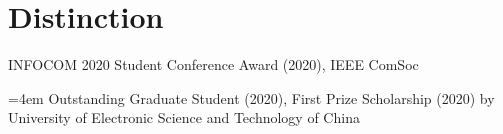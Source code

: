 \vspace{-8pt}
\section*{Distinction}
\vspace{-4pt}
\indent

INFOCOM 2020 Student Conference Award (2020), IEEE ComSoc

\hangindent=4em Outstanding Graduate Student (2020), First Prize Scholarship (2020)
\newline by University of Electronic Science and Technology of China
